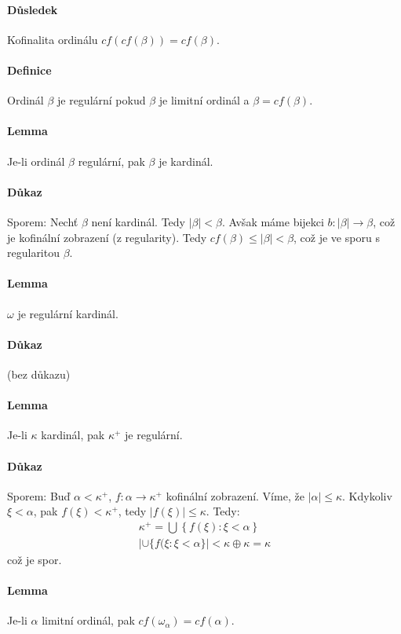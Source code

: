 \documentclass[a4paper,12pt,titlepage]{article}
\begin{document}
\paragraph{Důsledek}
Kofinalita ordinálu $cf(cf(\beta)) = cf(\beta)$.
\paragraph{Definice}
Ordinál $\beta$ je regulární pokud $\beta$ je limitní ordinál a $\beta =
cf(\beta)$.
\paragraph{Lemma}
Je-li ordinál $\beta$ regulární, pak $\beta$ je kardinál.
\paragraph{Důkaz} Sporem: Nechť $\beta$ není kardinál. Tedy $|\beta| < \beta$.
Avšak máme bijekci $b: |\beta| \to \beta$, což je kofinální zobrazení (z
regularity). Tedy $cf(\beta) \le |\beta| < \beta$, což je ve sporu s regularitou
$\beta$.
\paragraph{Lemma}
$\omega$ je regulární kardinál.
\paragraph{Důkaz}
(bez důkazu)
\paragraph{Lemma}
Je-li $\kappa$ kardinál, pak $\kappa^+$ je regulární.
\paragraph{Důkaz}
Sporem: Buď $\alpha < \kappa^+$, $f: \alpha \to \kappa^+$ kofinální zobrazení.
Víme, že
	$|\alpha| \le \kappa$.
Kdykoliv $\xi < \alpha$, pak $f(\xi) < \kappa^+$, tedy $|f(\xi)| \le \kappa$.
Tedy:
\begin{align}
	\kappa^+ = \bigcup \left\{f(\xi) : \xi < \alpha \right\} \\
	|\cup \{f(\xi: \xi < \alpha \}| < \kappa \oplus\kappa = \kappa
\end{align}
což je spor.
\paragraph{Lemma}
Je-li $\alpha$ limitní ordinál, pak $cf(\omega_\alpha) = cf(\alpha)$.
\end{document}
